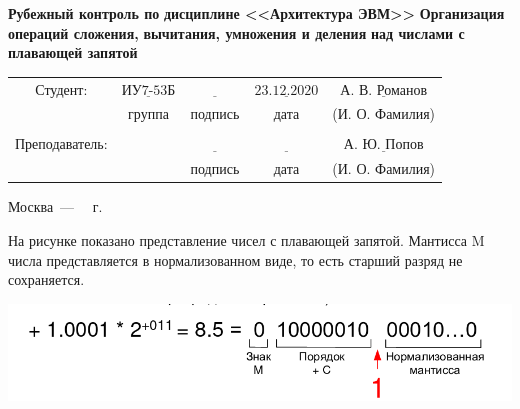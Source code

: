 \documentclass[a4paper,12pt]{article}
\begin{document}
	
	\begin{center}
		\noindent\begin{minipage}{1.3\textwidth}\centering
			\Large\textbf{  Рубежный контроль по  }\newline
			\Large\textbf{ дисциплине <<Архитектура ЭВМ>>}\newline\newline\newline
			\textbf{Организация операций сложения, }\newline
			\textbf{вычитания, умножения и деления}\newline
			\textbf{над числами с плавающей запятой}\newline\newline\newline\newline
		\end{minipage}
	\end{center}
	
	\begin{center}
		\begin{tabular}{ccccc}
			Студент: & $\underline{\text{ИУ7-53Б}}$ & $\underline{\text{~~~~~~~~~~~}}$ & $\underline{\text{23.12.2020}}$ & $\underline{\text{А. В. Романов}}$ \\
			& \footnotesize группа & \footnotesize подпись & \footnotesize дата  & \footnotesize (И. О. Фамилия) \\
			&  &  &  & \\
			Преподаватель: & \textbf{} & $\underline{\text{~~~~~~~~~~~}}$ & $\underline{\text{~~~~~~~~~~~~}}$ & $\underline{\text{А. Ю. Попов}}$ \\
			&  & \footnotesize подпись & \footnotesize дата  & \footnotesize (И. О. Фамилия) \\
		\end{tabular}
	\end{center}
	
	
	\begin{center}
		\vfill
		Москва~---~\the\year
		~г.
	\end{center}
	\clearpage

	На рисунке показано представление чисел с плавающей запятой. Мантисса M числа представляется в нормализованном виде, то есть старший разряд не сохраняется.
	
	\begin{center}
		\noindent \includegraphics[scale=0.4]{2.png}\newline
	\end{center}
\end{document}

